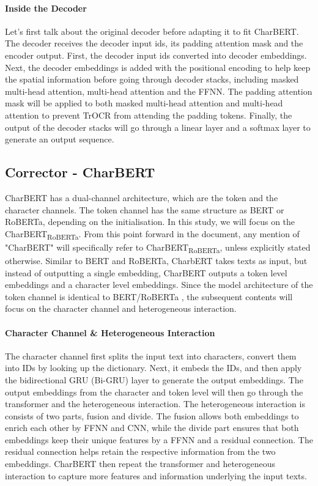 \paragraph*{Inside the Decoder}
\label{par:3_inside_the_decoder}
Let's first talk about the original decoder before adapting it to fit CharBERT. The decoder receives the decoder input ids, its padding attention mask and the encoder output. First, the decoder input ids converted into decoder embeddings. Next, the decoder embeddings is added with the positional encoding to help keep the spatial information before going through decoder stacks, including masked multi-head attention, multi-head attention and the FFNN. The padding attention mask will be applied to both masked multi-head attention and multi-head attention to prevent TrOCR from attending the padding tokens. Finally, the output of the decoder stacks will go through a linear layer and a softmax layer to generate an output sequence. 

\subsection{Corrector - CharBERT}
\label{subsec:3_corrector_charbert}
CharBERT has a dual-channel architecture, which are the token and the character channels. The token channel has the same structure as BERT or RoBERTa, depending on the initialisation. In this study, we will focus on the CharBERT\textsubscript{RoBERTa}. From this point forward in the document, any mention of "CharBERT" will specifically refer to CharBERT\textsubscript{RoBERTa}, unless explicitly stated otherwise. Similar to BERT and RoBERTa, CharbERT takes texts as input, but instead of outputting a single embedding, CharBERT outputs a token level embeddings and a character level embeddings. Since the model architecture of the token channel is identical to BERT/RoBERTa , the subsequent contents will focus on the character channel and heterogeneous interaction.

\paragraph*{Character Channel \& Heterogeneous Interaction}
\label{par:3_character_channel_heterogeneous_interaction}
The character channel first splits the input text into characters, convert them into IDs by looking up the dictionary. Next, it embeds the IDs, and then apply the bidirectional GRU (Bi-GRU) layer to generate the output embeddings. The output embeddings from the character and token level will then go through the transformer and the heterogeneous interaction. The heterogeneous interaction is consists of two parts, fusion and divide. The fusion allows both embeddings to enrich each other by FFNN and CNN, while the divide part ensures that both embeddings keep their unique features by a FFNN and a residual connection. The residual connection helps retain the respective information from the two embeddings. CharBERT then repeat the transformer and heterogeneous interaction to capture more features and information underlying the input texts.

